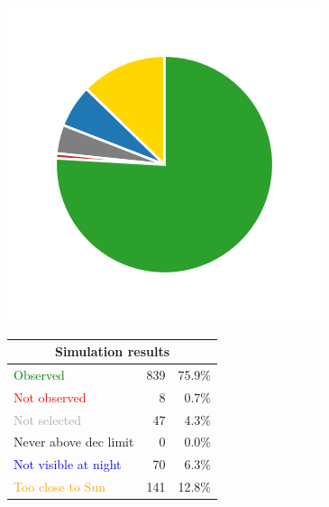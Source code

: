 \begin{colsection}
\begin{figure}[p]
    \begin{center}
        \begin{minipage}[t]{0.15\linewidth}\vspace{0.6cm}
            \includegraphics[trim={.5cm 0 .5cm 0},clip,width=\linewidth]{images/gw_sims/2n8+2s8_pie.png}
        \end{minipage}
        \begin{minipage}[t]{0.45\linewidth}\vspace{0pt}
            \begin{tabular}{lrr}
                \multicolumn{3}{c}{\textbf{Simulation results}} \\
                \midrule
                \textcolor{Green}{Observed} & 839 & 75.9\% \\
                \textcolor{Red}{Not observed} & 8 & 0.7\% \\
                \textcolor{darkgray}{Not selected} & 47 & 4.3\% \\
                \textcolor{NavyBlue}{Never above dec limit} & 0 & 0.0\% \\
                \textcolor{Blue}{Not visible at night} & 70 & 6.3\% \\
                \textcolor{Orange}{Too close to Sun} & 141 & 12.8\% \\

\end{tabular}
\end{minipage}
\end{center}
\end{figure}
\end{colsection}
